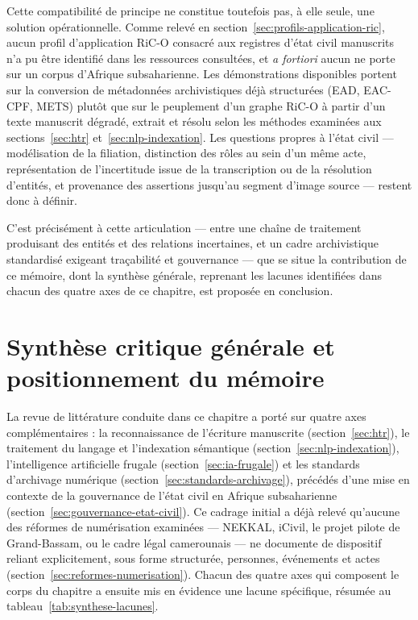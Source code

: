 Cette compatibilité de principe ne constitue toutefois pas, à elle seule, une solution opérationnelle. Comme relevé en section~\ref{sec:profils-application-ric}, aucun profil d'application RiC-O consacré aux registres d'état civil manuscrits n'a pu être identifié dans les ressources consultées, et \textit{a fortiori} aucun ne porte sur un corpus d'Afrique subsaharienne. Les démonstrations disponibles portent sur la conversion de métadonnées archivistiques déjà structurées (EAD, EAC-CPF, METS) plutôt que sur le peuplement d'un graphe RiC-O à partir d'un texte manuscrit dégradé, extrait et résolu selon les méthodes examinées aux sections~\ref{sec:htr} et~\ref{sec:nlp-indexation}. Les questions propres à l'état civil --- modélisation de la filiation, distinction des rôles au sein d'un même acte, représentation de l'incertitude issue de la transcription ou de la résolution d'entités, et provenance des assertions jusqu'au segment d'image source --- restent donc à définir.

C'est précisément à cette articulation --- entre une chaîne de traitement produisant des entités et des relations incertaines, et un cadre archivistique standardisé exigeant traçabilité et gouvernance --- que se situe la contribution de ce mémoire, dont la synthèse générale, reprenant les lacunes identifiées dans chacun des quatre axes de ce chapitre, est proposée en conclusion.

\section{Synthèse critique générale et positionnement du mémoire}
\label{sec:synthese-generale}

La revue de littérature conduite dans ce chapitre a porté sur quatre axes complémentaires : la reconnaissance de l'écriture manuscrite (section~\ref{sec:htr}), le traitement du langage et l'indexation sémantique (section~\ref{sec:nlp-indexation}), l'intelligence artificielle frugale (section~\ref{sec:ia-frugale}) et les standards d'archivage numérique (section~\ref{sec:standards-archivage}), précédés d'une mise en contexte de la gouvernance de l'état civil en Afrique subsaharienne (section~\ref{sec:gouvernance-etat-civil}). Ce cadrage initial a déjà relevé qu'aucune des réformes de numérisation examinées --- NEKKAL, iCivil, le projet pilote de Grand-Bassam, ou le cadre légal camerounais --- ne documente de dispositif reliant explicitement, sous forme structurée, personnes, événements et actes (section~\ref{sec:reformes-numerisation}). Chacun des quatre axes qui composent le corps du chapitre a ensuite mis en évidence une lacune spécifique, résumée au tableau~\ref{tab:synthese-lacunes}.

